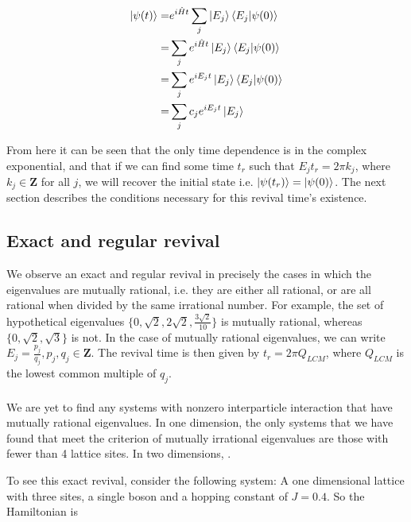 \documentclass[a4paper,10pt]{article}
\begin{document}
\begin{align}
 \ket{\psi(t)} =&       e^{i\hat{H}t}\sum_j\ket{E_j}\braket{E_j|\psi(0)} \\
               =&\sum_je^{i\hat{H}t}\ket{E_j}\braket{E_j|\psi(0)} \\
                =&\sum_je^{iE_{j}t}\ket{E_j}\braket{E_j|\psi(0)} \\
                =&\sum_j c_{j}e^{iE_{j}t}\ket{E_j}
\end{align}

From here it can be seen that the only time dependence is in the complex exponential, and that if we can find some time $t_r$ such that $E_{j}t_r=2\pi k_{j}$, where $k_j\in \mathbf{Z}$ for all $j$, 
we will recover the initial state i.e. $\ket{\psi(t_r)}=\ket{\psi(0)}$. The next section describes the conditions necessary for this revival time's existence.\\

\subsection{Exact and regular revival}

We observe an exact and regular revival in precisely the cases in which the eigenvalues are mutually rational, i.e. they are either all rational, or are all rational when 
divided by the same irrational number.
For example, the set of hypothetical eigenvalues $\{0,\sqrt{2},2\sqrt{2},\frac{3\sqrt{2}}{10}\}$ is mutually rational, whereas $\{0,\sqrt{2},\sqrt{3}\}$ is not. In the case of mutually rational eigenvalues, we can write
${E_j}=\frac{p_j}{q_j},p_j,q_j \in \mathbf{Z}$. The revival time is then given by $t_r=2\pi Q_{LCM}$, where $Q_{LCM}$ is the lowest common multiple of ${q_j}$. 
\\\\
We are yet to find any systems with nonzero interparticle interaction that have mutually rational eigenvalues.
In one dimension, the only systems that we have found that meet the criterion of mutually irrational eigenvalues are those with fewer than 4 lattice sites. In two
dimensions, .

To see this exact revival, consider the following system: A one dimensional lattice with three sites, a single boson and a hopping constant of $J=0.4$. So the Hamiltonian is
\end{document}
